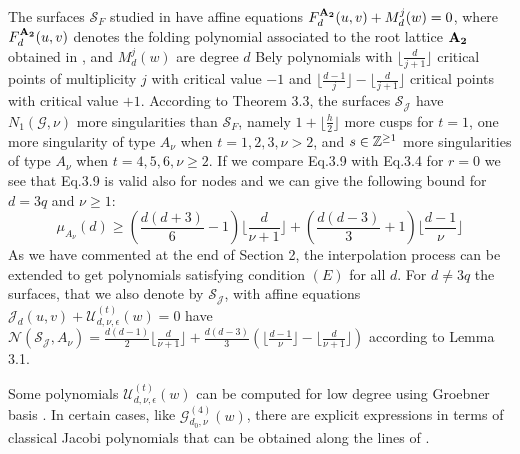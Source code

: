 \documentclass{birkjour_t2}
\theoremstyle{definition}
\theoremstyle{remark}
\numberwithin{equation}{section}
\begin{document}
    \begin{remark}
The surfaces $\mathcal{S}_{F}$ studied in  \cite{lab06} have affine equations $F_{d}^{\bf{A}_{2}}(u, v)+M^{j}_{d}(w)=0$, where $F_{d}^{\bf{A}_{2}}(u,v)$ denotes the folding polynomial associated to the root lattice $\bf{A}_{2}$ obtained in \cite{wit88, hof88}, and $M^{j}_{d}(w)$ are degree $d$ Bely polynomials with $\lfloor \frac{d}{j+1}\rfloor$ critical points of multiplicity $j$ with critical value $-1$ and $\lfloor \frac{d-1}{j}\rfloor-\lfloor \frac{d}{j+1}\rfloor$ critical points with critical value $+1$. According to Theorem 3.3, the surfaces $\mathcal{S_{J}}$ have $N_{1}(\mathcal{G}, \nu)$ more singularities than $\mathcal{S}_{F}$, namely $1+\Big \lfloor\frac{h}{2}\Big \rfloor$ more cusps for $t=1$, one more singularity of type $A_{\nu}$ when $t=1,2,3, \nu>2$, and $s\in {\Bbb{Z}}^{\geq 1}$ more singularities of type $A_{\nu}$ when $t=4,5, 6, \nu \geq 2$. If we compare Eq.3.9  with Eq.3.4 for $r=0$ we see that Eq.3.9 is valid also for nodes and we can give the following bound for $d=3q$ and $\nu \geq 1$:
     \begin{equation}  
\mu_{A_{\nu}}(d) \ge \left( \frac{d(d+3)}{6}-1\right)  \Big \lfloor \frac{d}{\nu+1} \Big \rfloor+\left(\frac{d(d-3)}{3}+1\right)\Big \lfloor \frac{d-1}{\nu}   \Big \rfloor
     \end{equation} 
     As we have commented at the end of Section 2, the interpolation process can be extended to get polynomials satisfying condition $(E)$ for all $d$. For $d \neq 3q$ the surfaces, that we also denote by $\mathcal{S_{J}}$, with affine equations ${\mathcal{J}}_{d}(u, v)+{\mathcal{U}}^{(t)}_{d,\nu,\epsilon}(w)=0$ have  $\mathcal{N}(\mathcal{S_{J}}, A_{\nu})=\frac{d(d-1)}{2}  \Big \lfloor \frac{d}{\nu+1} \Big \rfloor+\frac{d(d-3)}{3}\left(\Big \lfloor \frac{d-1}{\nu}   \Big \rfloor-    \Big \lfloor \frac{d}{\nu+1}   \Big \rfloor\right)$ according to Lemma 3.1.
             \end{remark}
     \par
Some polynomials ${\mathcal{U}}^{(t)}_{d,\nu,\epsilon}(w)$ can be computed for low degree using Groebner basis \cite{ lab06, esc14a, esc14b}. In certain cases, like ${\mathcal{G}}^{(4)}_{d_{0}, \nu}(w)$, there are explicit expressions in terms of classical Jacobi polynomials that  can be obtained along the lines of \cite{esc26}.
\end{document}
